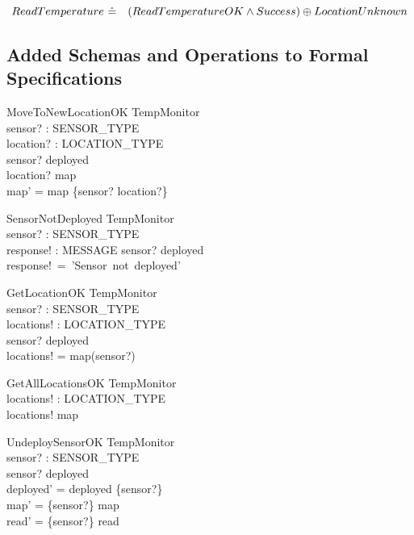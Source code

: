 \documentclass[12pt]{article}
\begin{document}
		\[ ReadTemperature~\hat{=}~\\
		~~~(ReadTemperatureOK \wedge Success) \oplus LocationUnknown \]
		
		\subsection{Added Schemas and Operations to Formal Specifications}

        \begin{schema}{MoveToNewLocationOK}
            \Delta TempMonitor\\
            sensor? : SENSOR\_TYPE\\
            location? : LOCATION\_TYPE\\
            \where
            sensor? \in deployed\\
            location? \notin \ran map\\
            map' = map \oplus \{sensor? \mapsto location?\} 
        \end{schema}
        
        \begin{schema}{SensorNotDeployed}
			\Xi TempMonitor\\
			sensor? : SENSOR\_TYPE\\
			response! : MESSAGE
			\where
			sensor? \notin deployed\\
			response!~=~'Sensor~not~deployed'\\
		\end{schema}
		
		\begin{schema}{GetLocationOK}
            \Xi TempMonitor\\
            sensor? : SENSOR\_TYPE\\
            locations! : LOCATION\_TYPE\\
            \where
            sensor? \in deployed\\
            locations! = map(sensor?)
        \end{schema}


        \begin{schema}{GetAllLocationsOK}
            \Xi TempMonitor\\
            locations! : LOCATION\_TYPE\\
            \where
            locations! \in \ran map
        \end{schema}
        
        \begin{schema}{UndeploySensorOK}
            \Delta TempMonitor\\
            sensor? : SENSOR\_TYPE\\
            \where
            sensor? \in deployed\\
            deployed' = deployed \setminus \{sensor?\}\\
            map' = \{sensor?\} \dsub map \\
            read' = \{sensor?\} \dsub read \\
        \end{schema}
        
\end{document}
